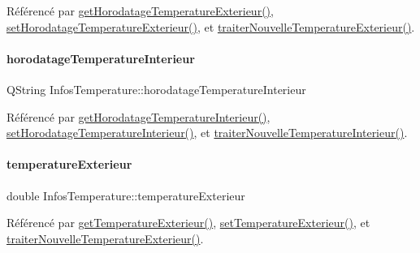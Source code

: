 Référencé par \hyperlink{class_infos_temperature_a76b07dc0790718e134e306fe760e6cbf}{get\+Horodatage\+Temperature\+Exterieur()}, \hyperlink{class_infos_temperature_a85118414b65a715d07a92df3059c6fea}{set\+Horodatage\+Temperature\+Exterieur()}, et \hyperlink{class_infos_temperature_ab8d95f48c31ca17c8690849562268420}{traiter\+Nouvelle\+Temperature\+Exterieur()}.

\mbox{\label{class_infos_temperature_ad4c62d479b8897102a59025a56d7b4c6}} 
\paragraph{\texorpdfstring{horodatage\+Temperature\+Interieur}{horodatageTemperatureInterieur}}
{\footnotesize\ttfamily Q\+String Infos\+Temperature\+::horodatage\+Temperature\+Interieur\hspace{0.3cm}{\ttfamily [private]}}



Référencé par \hyperlink{class_infos_temperature_aca40f109786cf22d78402f8b7f3fe408}{get\+Horodatage\+Temperature\+Interieur()}, \hyperlink{class_infos_temperature_a4d846391dfd204515e68c3f005b7be3c}{set\+Horodatage\+Temperature\+Interieur()}, et \hyperlink{class_infos_temperature_a547da18a7c04603d2f30eece061d9634}{traiter\+Nouvelle\+Temperature\+Interieur()}.

\mbox{\label{class_infos_temperature_af80286a5b0e05d0379f53c0ebbc7d483}} 
\paragraph{\texorpdfstring{temperature\+Exterieur}{temperatureExterieur}}
{\footnotesize\ttfamily double Infos\+Temperature\+::temperature\+Exterieur\hspace{0.3cm}{\ttfamily [private]}}



Référencé par \hyperlink{class_infos_temperature_aebb00308151b8b6319732b62bd7b4b55}{get\+Temperature\+Exterieur()}, \hyperlink{class_infos_temperature_a40f22fbc27ed768e8269cdbf3df708c6}{set\+Temperature\+Exterieur()}, et \hyperlink{class_infos_temperature_ab8d95f48c31ca17c8690849562268420}{traiter\+Nouvelle\+Temperature\+Exterieur()}.

